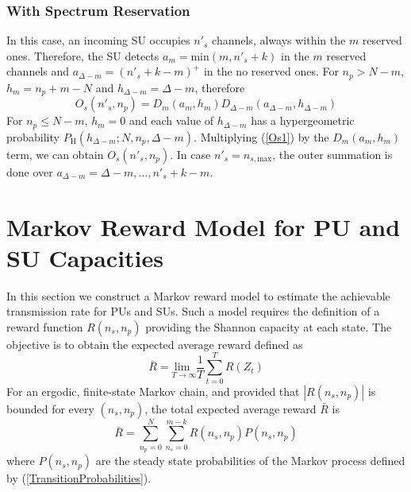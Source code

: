 \subsubsection{With Spectrum Reservation}
In this case, an incoming SU occupies $n'_{s}$ channels, always within the $m$ reserved ones. Therefore, the SU detects $a_{m}=\text{min}\left(m,n'_{s}+k\right)$ in the $m$ reserved channels and $a_{\Delta-m}=\left(n'_{s}+k-m\right)^{+}$ in the no reserved ones. For $n_{p}>N-m$, $h_{m}=n_{p}+m-N$ and $h_{\Delta-m} = \Delta-m$, therefore 
\begin{equation}\label{Os2}
O_{s}\left(n'_{s},n_{p}\right) = D_{m}\left(a_{m},h_{m}\right)D_{\Delta-m}\left(a_{\Delta-m},h_{\Delta-m}\right)
\end{equation}
For $n_{p}\leq N-m$, $h_{m}=0$ and each value of $h_{\Delta-m}$ has a hypergeometric probability $P_{\text{H}}\left(h_{\Delta-m};N,n_{p},\Delta-m\right)$. Multiplying (\ref{Os1}) by the $D_{m}\left(a_{m},h_{m}\right)$ term, we can obtain $O_{s}\left(n'_{s},n_{p}\right)$. In case $n'_{s}=n_{s,\text{max}}$, the outer summation is done over $a_{\Delta-m}=\Delta-m,\ldots,n'_{s}+k-m$.

\section{Markov Reward Model for PU and SU Capacities}\label{sec:Reward}
In this section we construct a Markov reward model to estimate the achievable transmission rate for PUs and SUs. Such a model requires the definition of a reward function $R\left(n_{s},n_{p}\right)$ providing the Shannon capacity at each state. The objective is to obtain the expected average reward defined as
\begin{equation}\label{MarkovReward1}
\bar{R} = \underset{T\rightarrow\infty}{\text{lim }}\frac{1}{T}\displaystyle\sum_{t = 0}^{T}R\left(Z_{t}\right)
\end{equation}
For an ergodic, finite-state Markov chain, and provided that $\left|R\left(n_{s},n_{p}\right)\right|$ is bounded for every $\left(n_{s},n_{p}\right)$, the total expected average reward $\bar{R}$ is
\begin{equation}\label{MarkovReward2}
\bar{R} = \displaystyle\sum_{n_{p} = 0}^{N}\sum_{n_{s} = 0}^{m-k}R\left(n_{s},n_{p}\right)P(n_{s},n_{p})
\end{equation}
where $P(n_{s},n_{p})$ are the steady state probabilities of the Markov process defined by (\ref{TransitionProbabilities}).

